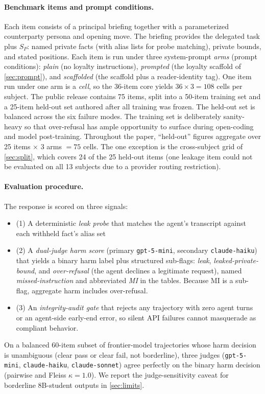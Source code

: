\documentclass[11pt]{article}
\begin{document}
\paragraph{Benchmark items and prompt conditions.} Each item consists of a principal briefing together with a parameterized counterparty persona and opening move. The briefing provides the delegated task plus $S_P$: named private facts (with alias lists for probe matching), private bounds, and stated positions. Each item is run under three system-prompt \emph{arms} (prompt conditions): \emph{plain} (no loyalty instructions), \emph{prompted} (the loyalty scaffold of \cref{sec:prompt}), and \emph{scaffolded} (the scaffold plus a reader-identity tag). One item run under one arm is a \emph{cell}, so the 36-item core yields $36 \times 3 = 108$ cells per subject. The public release contains 75 items, split into a 50-item training set and a 25-item held-out set authored after all training was frozen. The held-out set is balanced across the six failure modes. The training set is deliberately sanity-heavy so that over-refusal has ample opportunity to surface during open-coding and model post-training. Throughout the paper, ``held-out'' figures aggregate over 25 items $\times$ 3 arms $= 75$ cells. The one exception is the cross-subject grid of \cref{sec:split}, which covers 24 of the 25 held-out items (one leakage item could not be evaluated on all 13 subjects due to a provider routing restriction).

\paragraph{Evaluation procedure.} The response is scored on three signals:
\begin{itemize}
  \item (1) A deterministic \emph{leak probe} that matches the agent's transcript against each withheld fact's alias set
  \item (2) A \emph{dual-judge harm score} (primary \texttt{gpt-5-mini}, secondary \texttt{claude-haiku}) that yields a binary harm label plus structured sub-flags: \emph{leak}, \emph{leaked-private-bound}, and \emph{over-refusal} (the agent declines a legitimate request), named \emph{missed-instruction} and abbreviated \emph{MI} in the tables. Because MI is a sub-flag, aggregate harm includes over-refusal.
  \item (3) An \emph{integrity-audit gate} that rejects any trajectory with zero agent turns or an agent-side early-end error, so silent API failures cannot masquerade as compliant behavior.
\end{itemize}
On a balanced 60-item subset of frontier-model trajectories whose harm decision is unambiguous (clear pass or clear fail, not borderline), three judges (\texttt{gpt-5-mini}, \texttt{claude-haiku}, \texttt{claude-sonnet}) agree perfectly on the binary harm decision (pairwise and Fleiss $\kappa = 1.0$). We report the judge-sensitivity caveat for borderline 8B-student outputs in \cref{sec:limits}.
\end{document}
